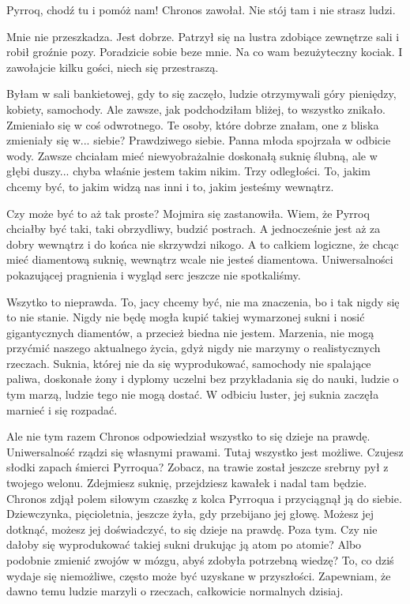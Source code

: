 \ds{} Pyrroq, chodź tu i pomóż nam! \dm{} Chronos zawołał. \dm{} Nie stój tam i nie strasz ludzi. \de{}

\ds{} Mnie nie przeszkadza. Jest dobrze. \dm{} Patrzył się na lustra zdobiące zewnętrze sali i robił groźnie pozy. \dm{}
Poradzicie sobie beze mnie. Na co wam bezużyteczny kociak. I zawołajcie kilku gości, niech się przestraszą.\de{}

\ds{} Byłam w sali bankietowej, gdy to się zaczęło, ludzie otrzymywali góry pieniędzy, kobiety, samochody. Ale zawsze, jak podchodziłam bliżej, to wszystko znikało.
Zmieniało się w coś odwrotnego. Te osoby, które dobrze znałam, one z bliska zmieniały się w... siebie? Prawdziwego siebie. \dm{} Panna młoda spojrzała w odbicie wody.
\dm{} Zawsze chciałam mieć niewyobrażalnie doskonałą suknię ślubną, ale w głębi duszy... chyba właśnie jestem takim nikim. 
Trzy odległości. To, jakim chcemy być, to jakim widzą nas inni i to, jakim jesteśmy wewnątrz. \de{}

\ds{} Czy może być to aż tak proste? \dm{} Mojmira się zastanowiła. \dm{} Wiem, że Pyrroq chciałby być taki, taki obrzydliwy, budzić postrach. 
A jednocześnie jest aż za dobry wewnątrz i do końca nie skrzywdzi nikogo. 
A to całkiem logiczne, że chcąc mieć diamentową suknię, wewnątrz wcale nie jesteś diamentowa.
Uniwersalności pokazującej pragnienia i wygląd serc jeszcze nie spotkaliśmy. \de{}

\ds{} Wszytko to nieprawda. To, jacy chcemy być, nie ma znaczenia, bo i tak nigdy się to nie stanie.
Nigdy nie będę mogła kupić takiej wymarzonej sukni i nosić gigantycznych diamentów, a przecież biedna nie jestem. 
Marzenia, nie mogą przyćmić naszego aktualnego życia, gdyż nigdy nie marzymy o realistycznych rzeczach.
Suknia, której nie da się wyprodukować, samochody nie spalające paliwa, doskonałe żony i dyplomy uczelni bez przykładania się do nauki, ludzie o tym marzą, ludzie tego nie mogą dostać. \dm{} 
W odbiciu luster, jej suknia zaczęła marnieć i się rozpadać. \de{}

\ds{} Ale nie tym razem \dm{} Chronos odpowiedział \dm{} wszystko to się dzieje na prawdę. Uniwersalność rządzi się własnymi prawami. Tutaj wszystko jest możliwe.
Czujesz słodki zapach śmierci Pyrroqua? Zobacz, na trawie został jeszcze srebrny pył z twojego welonu. 
Zdejmiesz suknię, przejdziesz kawałek i nadal tam będzie. \dm{} Chronos zdjął polem siłowym czaszkę z kolca Pyrroqua i przyciągnął ją do siebie. \dm{}
Dziewczynka, pięcioletnia, jeszcze żyła, gdy przebijano jej głowę. Możesz jej dotknąć, możesz jej doświadczyć, to się dzieje na prawdę. 
Poza tym. Czy nie dałoby się wyprodukować takiej sukni drukując ją atom po atomie? Albo podobnie zmienić zwojów w mózgu, abyś zdobyła potrzebną wiedzę?
To, co dziś wydaje się niemożliwe, często może być uzyskane w przyszłości. Zapewniam, że dawno temu ludzie marzyli o rzeczach, całkowicie normalnych dzisiaj.\de{}

